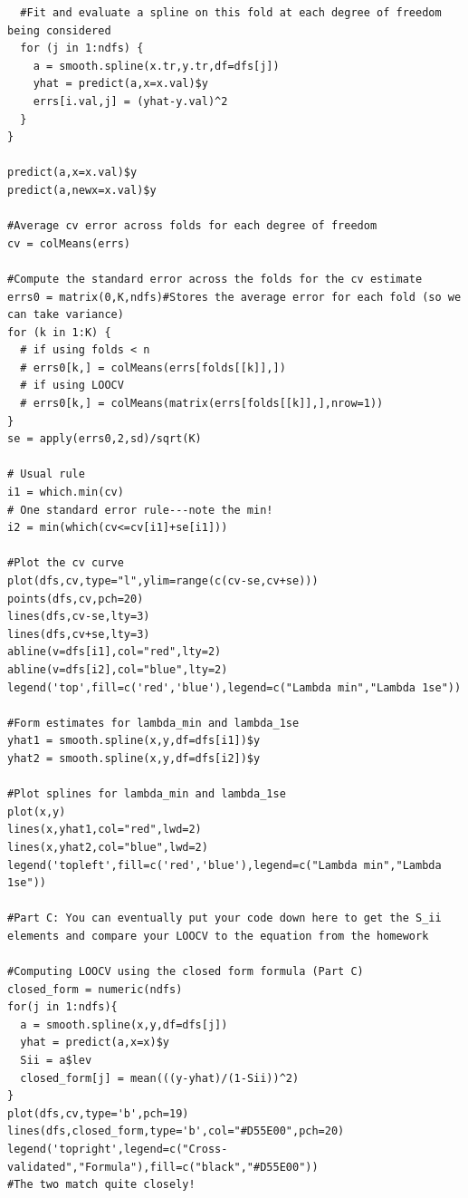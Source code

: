 \documentclass[12pt]{article}
\newcommand{\1}{\mathbbm{1}}
\begin{document}
\begin{verbatim}
  #Fit and evaluate a spline on this fold at each degree of freedom being considered
  for (j in 1:ndfs) {
    a = smooth.spline(x.tr,y.tr,df=dfs[j])
    yhat = predict(a,x=x.val)$y
    errs[i.val,j] = (yhat-y.val)^2
  }
}

predict(a,x=x.val)$y
predict(a,newx=x.val)$y

#Average cv error across folds for each degree of freedom
cv = colMeans(errs)

#Compute the standard error across the folds for the cv estimate
errs0 = matrix(0,K,ndfs)#Stores the average error for each fold (so we can take variance)
for (k in 1:K) {
  # if using folds < n
  # errs0[k,] = colMeans(errs[folds[[k]],])
  # if using LOOCV
  # errs0[k,] = colMeans(matrix(errs[folds[[k]],],nrow=1))
}
se = apply(errs0,2,sd)/sqrt(K)

# Usual rule
i1 = which.min(cv)
# One standard error rule---note the min!
i2 = min(which(cv<=cv[i1]+se[i1]))

#Plot the cv curve
plot(dfs,cv,type="l",ylim=range(c(cv-se,cv+se)))
points(dfs,cv,pch=20)
lines(dfs,cv-se,lty=3)
lines(dfs,cv+se,lty=3)
abline(v=dfs[i1],col="red",lty=2)
abline(v=dfs[i2],col="blue",lty=2)
legend('top',fill=c('red','blue'),legend=c("Lambda min","Lambda 1se"))

#Form estimates for lambda_min and lambda_1se
yhat1 = smooth.spline(x,y,df=dfs[i1])$y
yhat2 = smooth.spline(x,y,df=dfs[i2])$y

#Plot splines for lambda_min and lambda_1se
plot(x,y)
lines(x,yhat1,col="red",lwd=2)
lines(x,yhat2,col="blue",lwd=2)
legend('topleft',fill=c('red','blue'),legend=c("Lambda min","Lambda 1se"))

#Part C: You can eventually put your code down here to get the S_ii elements and compare your LOOCV to the equation from the homework

#Computing LOOCV using the closed form formula (Part C)
closed_form = numeric(ndfs)
for(j in 1:ndfs){
  a = smooth.spline(x,y,df=dfs[j])
  yhat = predict(a,x=x)$y
  Sii = a$lev
  closed_form[j] = mean(((y-yhat)/(1-Sii))^2)
}
plot(dfs,cv,type='b',pch=19)
lines(dfs,closed_form,type='b',col="#D55E00",pch=20)
legend('topright',legend=c("Cross-validated","Formula"),fill=c("black","#D55E00"))
#The two match quite closely!
























\end{verbatim}
\end{document}

